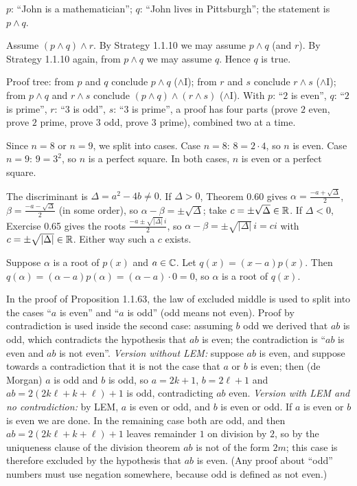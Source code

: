  $p$: ``John is a mathematician''; $q$: ``John lives in Pittsburgh''; the statement is $p\wedge q$.

 Assume $(p\wedge q)\wedge r$. By Strategy 1.1.10 we may assume $p\wedge q$ (and $r$). By Strategy 1.1.10 again, from $p\wedge q$ we may assume $q$. Hence $q$ is true.

 Proof tree: from $p$ and $q$ conclude $p\wedge q$ ($\wedge$I); from $r$ and $s$ conclude $r\wedge s$ ($\wedge$I); from $p\wedge q$ and $r\wedge s$ conclude $(p\wedge q)\wedge(r\wedge s)$ ($\wedge$I). With $p$: ``$2$ is even'', $q$: ``$2$ is prime'', $r$: ``$3$ is odd'', $s$: ``$3$ is prime'', a proof has four parts (prove $2$ even, prove $2$ prime, prove $3$ odd, prove $3$ prime), combined two at a time.

 Since $n=8$ or $n=9$, we split into cases. Case $n=8$: $8=2\cdot4$, so $n$ is even. Case $n=9$: $9=3^2$, so $n$ is a perfect square. In both cases, $n$ is even or a perfect square.

 The discriminant is $\Delta=a^2-4b\ne0$. If $\Delta>0$, Theorem 0.60 gives $\alpha=\frac{-a+\sqrt\Delta}2$, $\beta=\frac{-a-\sqrt\Delta}2$ (in some order), so $\alpha-\beta=\pm\sqrt\Delta$; take $c=\pm\sqrt\Delta\in\mathbb{R}$. If $\Delta<0$, Exercise 0.65 gives the roots $\frac{-a\pm\sqrt{|\Delta|}\,i}2$, so $\alpha-\beta=\pm\sqrt{|\Delta|}\,i=ci$ with $c=\pm\sqrt{|\Delta|}\in\mathbb{R}$. Either way such a $c$ exists.

 Suppose $\alpha$ is a root of $p(x)$ and $a\in\mathbb{C}$. Let $q(x)=(x-a)p(x)$. Then $q(\alpha)=(\alpha-a)p(\alpha)=(\alpha-a)\cdot0=0$, so $\alpha$ is a root of $q(x)$.

 In the proof of Proposition 1.1.63, the law of excluded middle is used to split into the cases ``$a$ is even'' and ``$a$ is odd'' (odd means not even). Proof by contradiction is used inside the second case: assuming $b$ odd we derived that $ab$ is odd, which contradicts the hypothesis that $ab$ is even; the contradiction is ``$ab$ is even and $ab$ is not even''. \emph{Version without LEM:} suppose $ab$ is even, and suppose towards a contradiction that it is not the case that $a$ or $b$ is even; then (de Morgan) $a$ is odd and $b$ is odd, so $a=2k+1$, $b=2\ell+1$ and $ab=2(2k\ell+k+\ell)+1$ is odd, contradicting $ab$ even. \emph{Version with LEM and no contradiction:} by LEM, $a$ is even or odd, and $b$ is even or odd. If $a$ is even or $b$ is even we are done. In the remaining case both are odd, and then $ab=2(2k\ell+k+\ell)+1$ leaves remainder $1$ on division by $2$, so by the uniqueness clause of the division theorem $ab$ is not of the form $2m$; this case is therefore excluded by the hypothesis that $ab$ is even. (Any proof about ``odd'' numbers must use negation somewhere, because odd is defined as not even.)

